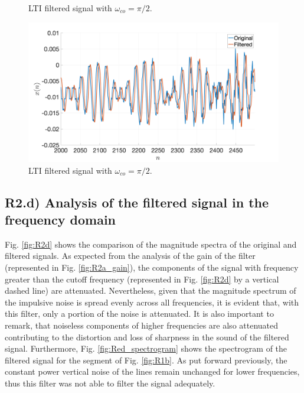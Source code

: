 \documentclass[a4paper, oneside, 11pt]{article}
\begin{document}
\begin{figure}[htbp]
\begin{minipage}[b]{.49\textwidth}
	\caption{LTI filtered signal with $\omega_{co} = \pi/2$.}
	\label{fig:R2c_zoomNoise}
\end{minipage}
\hfill
\begin{minipage}[b]{.49\textwidth}
	\centering
	\includegraphics[width= 1.1\textwidth]{figures/R2c_zoomNormal.png}
	\caption{LTI filtered signal with $\omega_{co} = \pi/2$.}
	\label{fig:R2c_zoomNormal}
\end{minipage}
\end{figure}

\subsection{R2.d) Analysis of the filtered signal in the frequency domain}
Fig. \ref{fig:R2d} shows the comparison of the magnitude spectra of the original and filtered signals. As expected from the analysis of the gain of the filter (represented in Fig. \ref{fig:R2a_gain}), the components of the signal with frequency greater than the cutoff frequency (represented in Fig. \ref{fig:R2d} by a vertical dashed line) are attenuated. Nevertheless, given that the magnitude spectrum of the impulsive noise is spread evenly across all frequencies, it is evident that, with this filter, only a portion of the noise is attenuated. It is also important to remark, that noiseless components of higher frequencies are also attenuated contributing to the distortion and loss of sharpness in the sound of the filtered signal. Furthermore, Fig. \ref{fig:Red_spectrogram} shows the spectrogram of the filtered signal for the segment of Fig. \ref{fig:R1b}. As put forward previously, the constant power vertical noise of the lines remain unchanged for lower frequencies, thus this filter was not able to filter the signal adequately.
\end{document}
